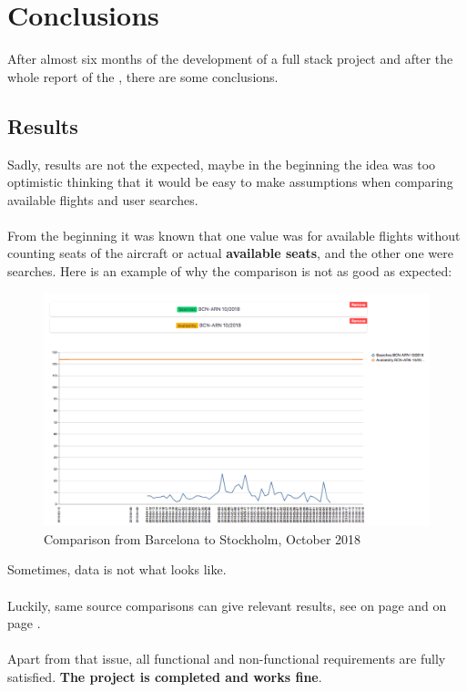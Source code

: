 
\chapter{Conclusions} \label{chapter11}

After almost six months of the development of a full stack project and after the whole report of the \thesis, there are some conclusions.

\section{Results}

Sadly, results are not the expected, maybe in the beginning the idea was too optimistic thinking that it would be easy to make assumptions when comparing available flights and user searches.
\\\\
From the beginning it was known that one value was for available flights without counting seats of the aircraft or actual \textbf{available seats}, and the other one were searches. Here is an example of why the comparison is not as good as expected:

\begin{figure}[H]
\centering
\includegraphics[scale=0.3]{resources/experiment03.png}
\caption{Comparison from Barcelona to Stockholm, October 2018}
\end{figure}

Sometimes, data is not what looks like.
\\\\
Luckily, same source comparisons can give relevant results, see  on page \pageref{exp1} and  on page \pageref{exp2}.
\\\\
Apart from that issue, all functional and non-functional requirements are fully satisfied. \textbf{The project is completed and works fine}.


